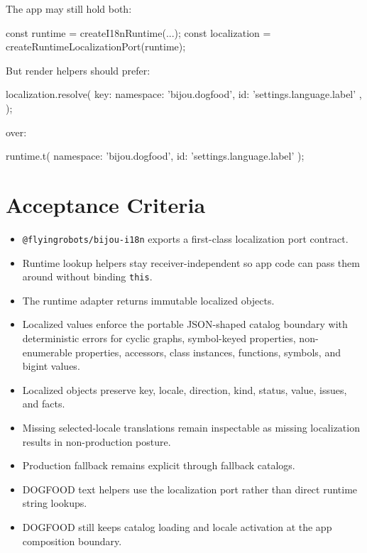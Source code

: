 The app may still hold both:

\begin{CodeBlock}
const runtime = createI18nRuntime(...);
const localization = createRuntimeLocalizationPort(runtime);
\end{CodeBlock}

But render helpers should prefer:

\begin{CodeBlock}
localization.resolve({
  key: { namespace: 'bijou.dogfood', id: 'settings.language.label' },
});
\end{CodeBlock}

over:

\begin{CodeBlock}
runtime.t({ namespace: 'bijou.dogfood', id: 'settings.language.label' });
\end{CodeBlock}

\section{Acceptance Criteria}\label{record-195-acceptance-criteria}

\begin{itemize}
\tightlist
\item
  \texttt{@\allowbreak{}f\allowbreak{}l\allowbreak{}y\allowbreak{}i\allowbreak{}n\allowbreak{}g\allowbreak{}r\allowbreak{}o\allowbreak{}b\allowbreak{}o\allowbreak{}t\allowbreak{}s\allowbreak{}/\allowbreak{}b\allowbreak{}i\allowbreak{}j\allowbreak{}o\allowbreak{}u\allowbreak{}-\allowbreak{}i\allowbreak{}1\allowbreak{}8\allowbreak{}n} exports a first-class localization port contract.
\item
  Runtime lookup helpers stay receiver-independent so app code can pass them around without binding \texttt{t\allowbreak{}h\allowbreak{}i\allowbreak{}s}.
\item
  The runtime adapter returns immutable localized objects.
\item
  Localized values enforce the portable JSON-shaped catalog boundary with deterministic errors for cyclic graphs, symbol-keyed properties, non-enumerable properties, accessors, class instances, functions, symbols, and bigint values.
\item
  Localized objects preserve key, locale, direction, kind, status, value, issues, and facts.
\item
  Missing selected-locale translations remain inspectable as missing localization results in non-production posture.
\item
  Production fallback remains explicit through fallback catalogs.
\item
  DOGFOOD text helpers use the localization port rather than direct runtime string lookups.
\item
  DOGFOOD still keeps catalog loading and locale activation at the app composition boundary.
\end{itemize}

